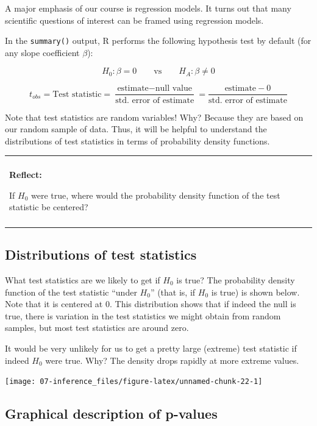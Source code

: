 \documentclass[
]{book}
\newenvironment{reflect}
{
    \begin{center}
    
    \begin{tabular}{|p{0.8\textwidth}|}
    \rowcolor{LightBlue}
    \hline\\
    \rowcolor{LightBlue}
    \textbf{Reflect:}
}
{
    \\\rowcolor{LightBlue}
    \\\hline
    \end{tabular} 
    \end{center}
}
\begin{document}
A major emphasis of our course is regression models. It turns out that many scientific questions of interest can be framed using regression models.

In the \texttt{summary()} output, R performs the following hypothesis test by default (for any slope coefficient \(\beta\)):

\[H_0: \beta = 0 \qquad \text{vs} \qquad H_A: \beta \neq 0\]

\[t_{obs} = \text{Test statistic} = \frac{\text{estimate} - \text{null value}}{\text{std. error of estimate}} = \frac{\text{estimate} - 0}{\text{std. error of estimate}} \]

Note that test statistics are random variables! Why? Because they are based on our random sample of data. Thus, it will be helpful to understand the distributions of test statistics in terms of probability density functions.

\begin{reflect}
If \(H_0\) were true, where would the probability density function of
the test statistic be centered?
\end{reflect}

\hypertarget{distributions-of-test-statistics}{%
\subsection{Distributions of test statistics}\label{distributions-of-test-statistics}}

What test statistics are we likely to get if \(H_0\) is true? The probability density function of the test statistic ``under \(H_0\)'' (that is, if \(H_0\) is true) is shown below. Note that it is centered at 0. This distribution shows that if indeed the null is true, there is variation in the test statistics we might obtain from random samples, but most test statistics are around zero.

It would be very unlikely for us to get a pretty large (extreme) test statistic if indeed \(H_0\) were true. Why? The density drops rapidly at more extreme values.

\begin{center}\texttt{[image: 07-inference\_files/figure-latex/unnamed-chunk-22-1]} \end{center}

\hypertarget{graphical-description-of-p-values}{%
\subsection{Graphical description of p-values}\label{graphical-description-of-p-values}}
\end{document}
